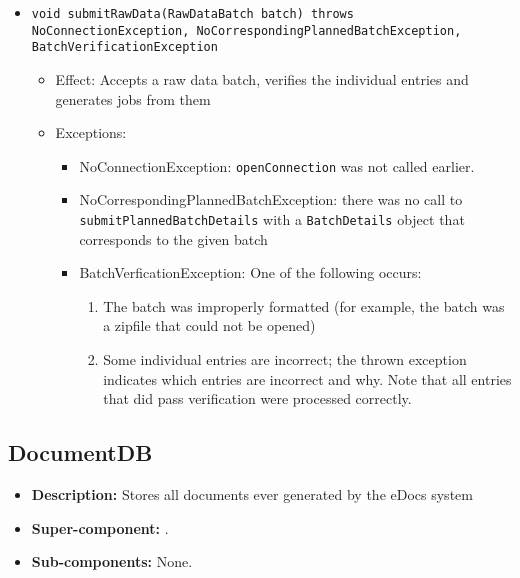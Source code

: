 \begin{itemize}
\begin{itemize}
		\item \texttt{void submitRawData(RawDataBatch batch) throws NoConnectionException, NoCorrespondingPlannedBatchException, BatchVerificationException}
		\begin{itemize}
			\item Effect: Accepts a raw data batch, verifies the individual entries and generates jobs from them
			\item Exceptions:
			\begin{itemize}
				\item NoConnectionException: \texttt{openConnection} was not called earlier.
				\item NoCorrespondingPlannedBatchException: there was no call to \texttt{submitPlannedBatchDetails} with a \texttt{BatchDetails} object that corresponds to the given batch
				\item BatchVerficationException: One of the following occurs:
				\begin{enumerate}
					\item The batch was improperly formatted (for example, the batch was a zipfile that could not be opened)
					\item Some individual entries are incorrect; the thrown exception indicates which entries are incorrect and why. Note that all entries that did pass verification were processed correctly.
				\end{enumerate} 
			\end{itemize}
		\end{itemize}
	\end{itemize}
\end{itemize}

\subsection{DocumentDB}
\begin{itemize}
    \item \textbf{Description:} Stores all documents ever generated by the eDocs system
    \item \textbf{Super-component:} .
    \item \textbf{Sub-components:} None.
\end{itemize}

